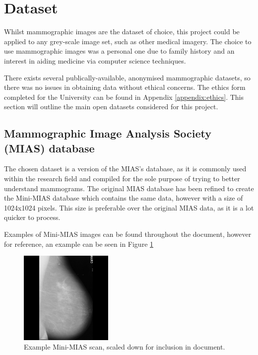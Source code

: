 \section{Dataset}

Whilst mammographic images are the dataset of choice, this project could be applied to any grey-scale image set, such as other medical imagery. The choice to use mammographic images was a personal one due to family history and an interest in aiding medicine via computer science techniques.

There exists several publically-available, anonymised mammographic datasets, so there was no issues in obtaining data without ethical concerns. The ethics form completed for the University can be found in Appendix \ref{appendix:ethics}. This section will outline the main open datasets considered for this project.

\subsection{Mammographic Image Analysis Society (MIAS) database}

The chosen dataset is a version of the \acrfull{MIAS}'s database, as it is commonly used within the research field and compiled for the sole purpose of trying to better understand mammograms. The original \acrshort{MIAS} database has been refined to create the Mini-\acrshort{MIAS} database which contains the same data, however with a size of 1024x1024 pixels. This size is preferable over the original \acrshort{MIAS} data, as it is a lot quicker to process.

Examples of Mini-\acrshort{MIAS} images can be found throughout the document, however for reference, an example can be seen in Figure \ref{fig:mini-mias}

\begin{figure}[H]
  \centering
  \includegraphics[width=0.4\textwidth]{Chapter2/tools/mias.jpg}
  \caption{Example Mini-MIAS scan, scaled down for inclusion in document.}
  \label{fig:mini-mias}
\end{figure}


